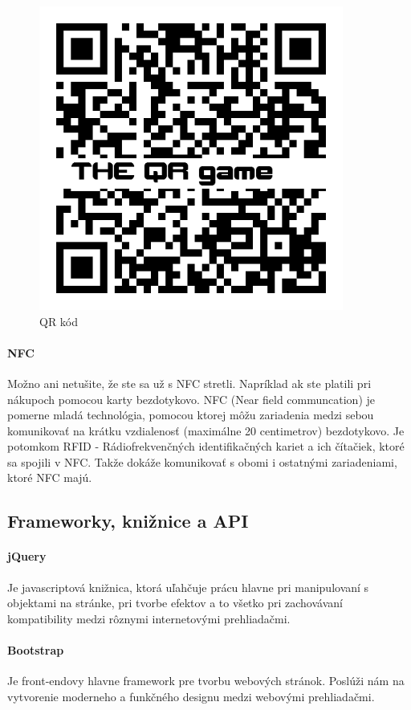 \begin{figure}[h]
  \centering
  \includegraphics[height=10cm]{mainmatter/imgs/qr.png}
  \caption{QR kód}
  \label{fig:comenius}
\end{figure}

\paragraph{NFC} Možno ani netušite, že ste sa už s NFC stretli. Napríklad ak ste platili pri nákupoch pomocou karty bezdotykovo. NFC (Near field communcation) je pomerne mladá technológia, pomocou ktorej môžu zariadenia medzi sebou komunikovať na krátku vzdialenosť (maximálne 20 centimetrov) bezdotykovo. Je potomkom RFID - Rádiofrekvenčných identifikačných kariet a ich čítačiek, ktoré sa spojili v NFC. Takže dokáže komunikovať s obomi i ostatnými zariadeniami, ktoré NFC majú.


\subsection{Frameworky, knižnice a API}


\paragraph{jQuery} Je javascriptová knižnica, ktorá uľahčuje prácu hlavne pri manipulovaní s objektami na stránke, pri tvorbe efektov a to všetko pri zachovávaní kompatibility medzi rôznymi internetovými prehliadačmi.

\paragraph{Bootstrap} Je front-endovy hlavne framework pre tvorbu webových stránok. Poslúži nám na vytvorenie moderneho a funkčného designu  medzi webovými prehliadačmi. 

